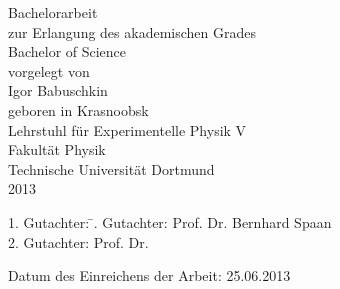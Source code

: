 \thispagestyle{empty}
\begin{center}
  \huge\textsf{\textbf{\thetitle}}
  \vfill
  \Large
  Bachelorarbeit \\
  zur Erlangung des akademischen Grades
  \\ Bachelor of Science \\[20pt]
  \normalsize
  vorgelegt von \\[5pt]
  {\Large Igor Babuschkin} \\[5pt]
  geboren in Krasnoobsk \\
  \vspace{20pt}
  Lehrstuhl für Experimentelle Physik V \\
  Fakultät Physik \\
  Technische Universität Dortmund \\
  2013
\end{center}
\newpage

\thispagestyle{empty}
\vspace*{\fill}
\begin{tabbing}
  1. Gutachter: \=. Gutachter: \>Prof. Dr. Bernhard Spaan \\[11pt]
  2. Gutachter: \>Prof. Dr.
\end{tabbing}
\vspace{22pt}
Datum des Einreichens der Arbeit: 25.06.2013
\newpage

\tableofcontents
\newpage
